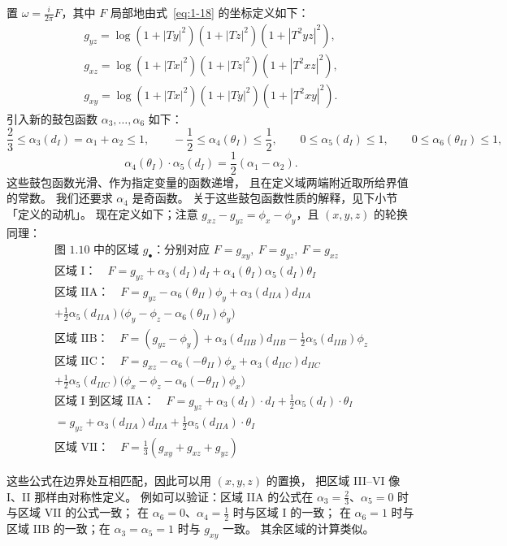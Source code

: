\begin{definition}[辛形式的定义]\label{def:symplectic-form}
置 $\omega=\frac{i}{2\pi}F$，其中 $F$ 局部地由式~\eqref{eq:1-18} 的坐标定义如下：
\begin{equation}\label{eq:1-21}
\begin{gathered}
g_{yz}=\log(1+|Ty|^2)(1+|Tz|^2)(1+|T^2yz|^2),\\
g_{xz}=\log(1+|Tx|^2)(1+|Tz|^2)(1+|T^2xz|^2),\\
g_{xy}=\log(1+|Tx|^2)(1+|Ty|^2)(1+|T^2xy|^2).
\end{gathered}
\end{equation}
引入新的鼓包函数 $\alpha_3,\dots,\alpha_6$ 如下：
\[
\frac23\le\alpha_3(d_I)=\alpha_1+\alpha_2\le1,\qquad
-\frac12\le\alpha_4(\theta_I)\le\frac12,\qquad
0\le\alpha_5(d_I)\le1,\qquad
0\le\alpha_6(\theta_{II})\le1,
\]
\[
\alpha_4(\theta_I)\cdot\alpha_5(d_I)=\frac12(\alpha_1-\alpha_2).
\]
这些鼓包函数光滑、作为指定变量的函数递增，
且在定义域两端附近取所给界值的常数。
我们还要求 $\alpha_4$ 是奇函数。
关于这些鼓包函数性质的解释，见下小节「定义的动机」。
现在定义如下；注意 $g_{xz}-g_{yz}=\phi_x-\phi_y$，且 $(x,y,z)$ 的轮换同理：
\begin{equation}\label{eq:1-22}
\begin{gathered}
\text{图 1.10 中的区域 } g_{\bullet}\text{：分别对应 }F=g_{xy},\ F=g_{yz},\ F=g_{xz}\\
\text{区域 I：}\quad F=g_{yz}+\alpha_3(d_I)d_I+\alpha_4(\theta_I)\alpha_5(d_I)\theta_I\\
\text{区域 IIA：}\quad F=g_{yz}-\alpha_6(\theta_{II})\phi_y+\alpha_3(d_{IIA})d_{IIA}\\
+\frac12\alpha_5(d_{IIA})\bigl(\phi_y-\phi_z-\alpha_6(\theta_{II})\phi_y\bigr)\\
\text{区域 IIB：}\quad F=(g_{yz}-\phi_y)+\alpha_3(d_{IIB})d_{IIB}-\frac12\alpha_5(d_{IIB})\phi_z\\
\text{区域 IIC：}\quad F=g_{xz}-\alpha_6(-\theta_{II})\phi_x+\alpha_3(d_{IIC})d_{IIC}\\
+\frac12\alpha_5(d_{IIC})\bigl(\phi_x-\phi_z-\alpha_6(-\theta_{II})\phi_x\bigr)\\
\text{区域 I 到区域 IIA：}\quad F=g_{yz}+\alpha_3(d_I)\cdot d_I+\frac12\alpha_5(d_I)\cdot\theta_I\\
=g_{yz}+\alpha_3(d_{IIA})d_{IIA}+\frac12\alpha_5(d_{IIA})\cdot\theta_I\\
\text{区域 VII：}\quad F=\frac13(g_{xy}+g_{xz}+g_{yz})
\end{gathered}
\end{equation}

这些公式在边界处互相匹配，因此可以用 $(x,y,z)$ 的置换，
把区域 III–VI 像 I、II 那样由对称性定义。
例如可以验证：区域 IIA 的公式在 $\alpha_3=\frac23$、$\alpha_5=0$ 时与区域 VII 的公式一致；
在 $\alpha_6=0$、$\alpha_4=\frac12$ 时与区域 I 的一致；
在 $\alpha_6=1$ 时与区域 IIB 的一致；在 $\alpha_3=\alpha_5=1$ 时与 $g_{xy}$ 一致。
其余区域的计算类似。
\end{definition}

